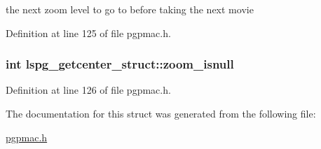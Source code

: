 the next zoom level to go to before taking the next movie 

Definition at line 125 of file pgpmac.h.\hypertarget{structlspg__getcenter__struct_a6ca85a8de29039188357b2814acd7803}{
\subsubsection[{zoom\_\-isnull}]{\setlength{\rightskip}{0pt plus 5cm}int {\bf lspg\_\-getcenter\_\-struct::zoom\_\-isnull}}}
\label{structlspg__getcenter__struct_a6ca85a8de29039188357b2814acd7803}


Definition at line 126 of file pgpmac.h.

The documentation for this struct was generated from the following file:\begin{DoxyCompactItemize}
\item 
\hyperlink{pgpmac_8h}{pgpmac.h}\end{DoxyCompactItemize}
